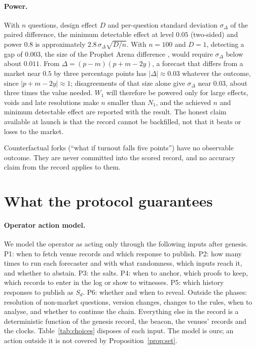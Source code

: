 \documentclass[11pt]{article}
\begin{document}
\paragraph{Power.} With $n$ questions, design effect $D$ and per-question standard deviation $\sigma_\Delta$ of the paired difference, the minimum detectable effect at level $0.05$ (two-sided) and power $0.8$ is approximately $2.8\,\sigma_\Delta \sqrt{D/n}$. With $n = 100$ and $D = 1$, detecting a gap of $0.003$, the size of the Prophet Arena difference \citep{yang2025prophet}, would require $\sigma_\Delta$ below about $0.011$. From $\Delta = (p-m)(p+m-2y)$, a forecast that differs from a market near $0.5$ by three percentage points has $|\Delta| \approx 0.03$ whatever the outcome, since $|p+m-2y| \approx 1$; disagreements of that size alone give $\sigma_\Delta$ near $0.03$, about three times the value needed. $W_1$ will therefore be powered only for large effects, voids and late resolutions make $n$ smaller than $N_1$, and the achieved $n$ and minimum detectable effect are reported with the result. The honest claim available at launch is that the record cannot be backfilled, not that it beats or loses to the market.

Counterfactual forks (``what if turnout falls five points'') have no observable outcome. They are never committed into the scored record, and no accuracy claim from the record applies to them.

\section{What the protocol guarantees}
\label{sec:guarantees}

\paragraph{Operator action model.} We model the operator as acting only through the following inputs after genesis. P1: when to fetch venue records and which response to publish. P2: how many times to run each forecaster and with what randomness, which inputs reach it, and whether to abstain. P3: the salts. P4: when to anchor, which proofs to keep, which records to enter in the log or show to witnesses. P5: which history responses to publish as $S_d$. P6: whether and when to reveal. Outside the phases: resolution of non-market questions, version changes, changes to the rules, when to analyse, and whether to continue the chain. Everything else in the record is a deterministic function of the genesis record, the beacon, the venues' records and the clocks. Table~\ref{tab:choices} disposes of each input. The model is ours; an action outside it is not covered by Proposition~\ref{prop:set}.
\end{document}
